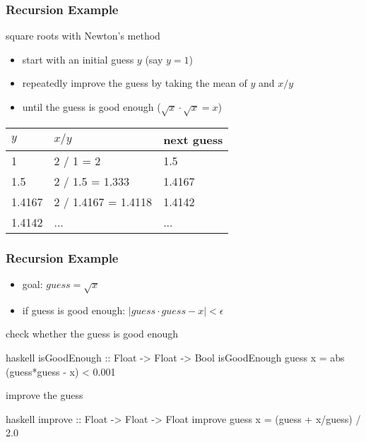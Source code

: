 \documentclass[dvipsnames]{beamer}
\theoremstyle{plain}
\begin{document}
\begin{frame}
  \frametitle{Recursion Example}

  \begin{exampleblock}{square roots with Newton's method}
    \begin{itemize}
      \item start with an initial guess $y$ (say $y = 1$)
      \item repeatedly improve the guess by taking the mean of $y$
        and $x / y$
      \item until the guess is good enough ($\sqrt x \cdot \sqrt x = x$)
    \end{itemize}

    \begin{center}
      \begin{tabular}{lll}
      $y$      & $x / y$             & next guess\\\hline
      1        & 2 / 1 = 2           & 1.5\\
      1.5      & 2 / 1.5 = 1.333     & 1.4167\\
      1.4167   & 2 / 1.4167 = 1.4118 & 1.4142\\
      1.4142   & ...                 & ...
      \end{tabular}
    \end{center}
  \end{exampleblock}
\end{frame}

\begin{frame}[fragile]
  \frametitle{Recursion Example}

  \begin{itemize}
    \item goal: $guess = \sqrt x$
    \item if guess is good enough: $|guess \cdot guess - x| < \epsilon$
  \end{itemize}

  \pause
  \begin{exampleblock}{check whether the guess is good enough}
    \begin{pygments}{haskell}
isGoodEnough :: Float -> Float -> Bool
isGoodEnough guess x = abs (guess*guess - x) < 0.001
    \end{pygments}
  \end{exampleblock}

  \pause
  \begin{exampleblock}{improve the guess}
    \begin{pygments}{haskell}
improve :: Float -> Float -> Float
improve guess x = (guess + x/guess) / 2.0
    \end{pygments}
  \end{exampleblock}
\end{frame}
\end{document}
